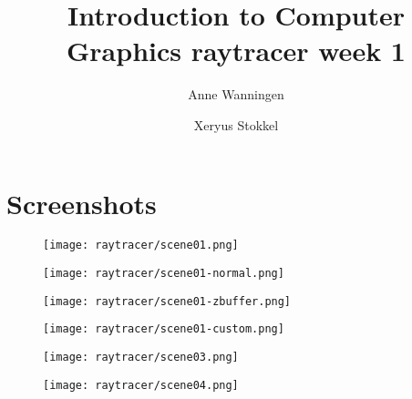 \documentclass{beamer}
\author{Anne Wanningen \and Xeryus Stokkel}
\title[Week 1]{Introduction to Computer Graphics raytracer week 1}
\begin{document}
\maketitle

\section{Screenshots}
\begin{frame}
	\begin{figure}
		\texttt{[image: raytracer/scene01.png]}
	\end{figure}
\end{frame}
\begin{frame}
	\begin{figure}
		\texttt{[image: raytracer/scene01-normal.png]}
	\end{figure}
\end{frame}
\begin{frame}
	\begin{figure}
		\texttt{[image: raytracer/scene01-zbuffer.png]}
	\end{figure}
\end{frame}
\begin{frame}
	\begin{figure}
		\texttt{[image: raytracer/scene01-custom.png]}
	\end{figure}
\end{frame}
\begin{frame}
	\begin{figure}
		\texttt{[image: raytracer/scene03.png]}
	\end{figure}
\end{frame}
\begin{frame}
	\begin{figure}
		\texttt{[image: raytracer/scene04.png]}
	\end{figure}
\end{frame}
\end{document}
